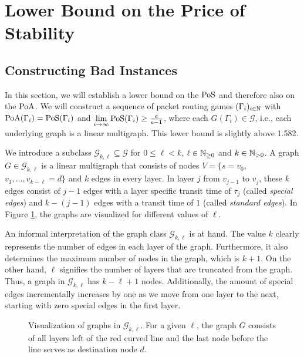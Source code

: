 \section{Lower Bound on the Price of Stability}\label{sec:pos}

\subsection{Constructing Bad Instances}\label{sec:posBadInst}
In this section, we will establish a lower bound on the $\operatorname*{PoS}$ and therefore also on the $\operatorname*{PoA}$. We will construct a sequence of packet routing games $(\Gamma_i)_{i \in \mathbb{N}}$ with $\operatorname*{PoA}(\Gamma_i) = \operatorname*{PoS}(\Gamma_i)$ and $\lim\limits_{i \rightarrow \infty} \operatorname*{PoS}(\Gamma_i) \geq \frac{e}{e-1}$, where each $G(\Gamma_i)\in \mathcal{G}$, i.e., each underlying graph is a linear multigraph. This lower bound is slightly above 1.582.

We introduce a subclass $\mathcal{G}_{k,\ell}\subseteq \mathcal{G}$ for $0\leq\ell<k$, $\ell \in \mathbb{N}_{\geq 0}$ and $k\in \mathbb{N}_{>0}$. A graph $G\in\mathcal{G}_{k,\ell}$ is a linear multigraph that consists of nodes $V=\{s=v_0,$ $v_1,\ldots,v_{k-\ell}=d\}$ and $k$ edges in every layer. In layer $j$ from $v_{j-1}$ to $v_j$, these $k$ edges consist of $j-1$ edges with a layer specific transit time of $\tau_j$ (called \emph{special edges}) and $k-(j-1)$ edges with a transit time of $1$ (called \emph{standard edges}). In Figure \ref{klayersl1}, the graphs are visualized for different values of $\ell$. 

An informal interpretation of the graph class $\mathcal{G}_{k,\ell}$ is at hand. The value $k$ clearly represents the number of edges in each layer of the graph. Furthermore, it also determines the maximum number of nodes in the graph, which is $k+1$. 
On the other hand, $\ell$ signifies the number of layers that are truncated from the graph. Thus, a graph in $\mathcal{G}_{k,\ell}$ has $k-\ell+1$ nodes.
Additionally, the amount of special edges incrementally increases by one as we move from one layer to the next, starting with zero special edges in the first layer.

\begin{figure}[H]
    \resizebox{\linewidth}{!}{} 
    \caption{Visualization of graphs in $\mathcal{G}_{k,\ell}$. For a given $\ell$, the graph $G$ consists of all layers left of the red curved line and the last node before the line serves as destination node $d$.}
    \label{klayersl1}
\end{figure}

